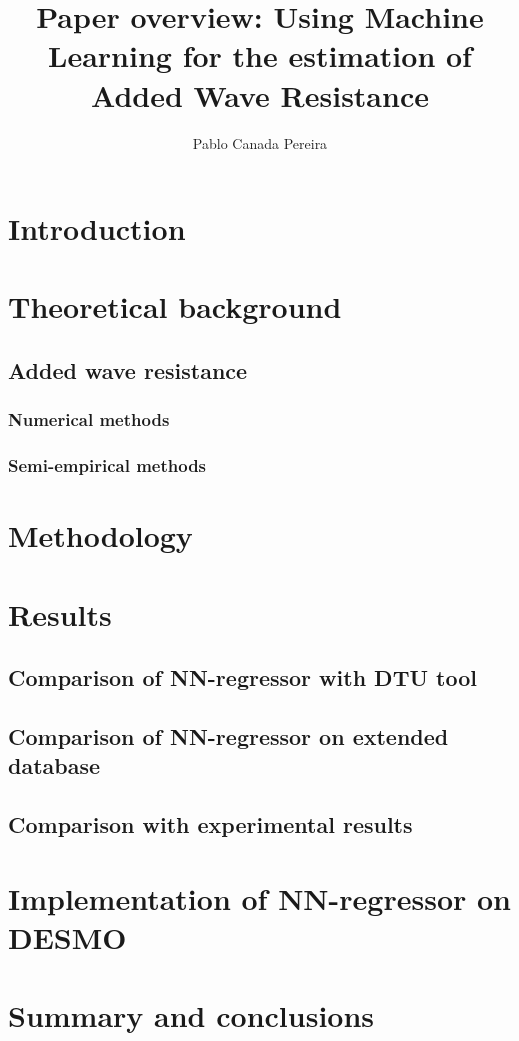 \documentclass[5pt, twocolumn]{article}
\title{Paper overview: Using Machine Learning for the estimation of Added Wave Resistance }
\author{Pablo Canada Pereira}
\begin{document}
\maketitle

\section{Introduction}
\section{Theoretical background}
\subsection{Added wave resistance}
\subsubsection{Numerical methods}
\subsubsection{Semi-empirical methods}
\section{Methodology}
\section{Results}
\subsection{Comparison of NN-regressor with DTU tool}
\subsection{Comparison of NN-regressor on extended database}
\subsection{Comparison with experimental results}
\section{Implementation of NN-regressor on DESMO}
\section{Summary and conclusions}
\end{document}
